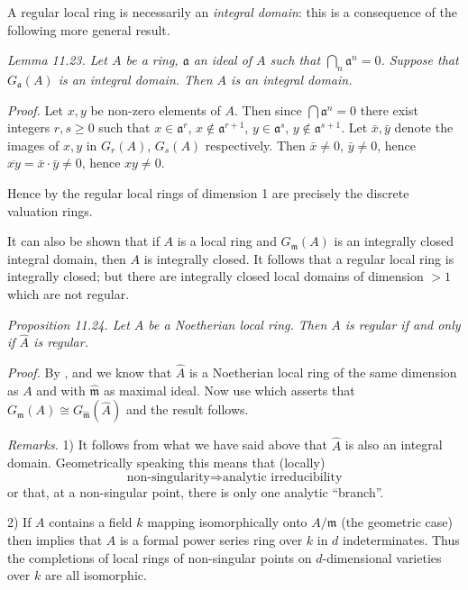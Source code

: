 A regular local ring is necessarily an \textit{integral domain}: this is a consequence of the following more general result.

\medskip
\noindent\textit{Lemma 11.23. Let $A$ be a ring, $\mathfrak a$ an ideal of $A$ such that $\bigcap_n\mathfrak a^n=0$. Suppose that $G_{\mathfrak a}(A)$ is an integral domain. Then $A$ is an integral domain.}

\textit{Proof.} Let $x,y$ be non-zero elements of $A$. Then since $\bigcap\mathfrak a^n=0$ there exist integers $r,s\geq0$ such that $x\in\mathfrak a^r$, $x\notin\mathfrak a^{r+1}$, $y\in\mathfrak a^s$, $y\notin\mathfrak a^{s+1}$. Let $\bar x,\bar y$ denote the images of $x,y$ in $G_r(A)$, $G_s(A)$ respectively. Then $\bar x\neq0$, $\bar y\neq0$, hence $\overline{xy}=\bar x\cdot\bar y\neq0$, hence $xy\neq0$. \proofbox

Hence by  the regular local rings of dimension 1 are precisely the discrete valuation rings.

It can also be shown that if $A$ is a local ring and $G_{\mathfrak m}(A)$ is an integrally closed integral domain, then $A$ is integrally closed. It follows that a regular local ring is integrally closed; but there are integrally closed local domains of dimension $>1$ which are not regular.

\medskip
\noindent\textit{Proposition 11.24. Let $A$ be a Noetherian local ring. Then $A$ is regular if and only if $\widehat A$ is regular.}

\textit{Proof.} By ,  and  we know that $\widehat A$ is a Noetherian local ring of the same dimension as $A$ and with $\widehat{\mathfrak m}$ as maximal ideal. Now use  which asserts that $G_{\mathfrak m}(A)\cong G_{\widehat{\mathfrak m}}(\widehat A)$ and the result follows. \proofbox

\textit{Remarks.} 1) It follows from what we have said above that $\widehat A$ is also an integral domain. Geometrically speaking this means that (locally)
\[
 \text{non-singularity}\Rightarrow\text{analytic irreducibility}
\]
or that, at a non-singular point, there is only one analytic ``branch''.

2) If $A$ contains a field $k$ mapping isomorphically onto $A/\mathfrak m$ (the geometric case) then  implies that $\widehat A$ is a formal power series ring over $k$ in $d$ indeterminates. Thus the completions of local rings of non-singular points on $d$-dimensional varieties over $k$ are all isomorphic.

